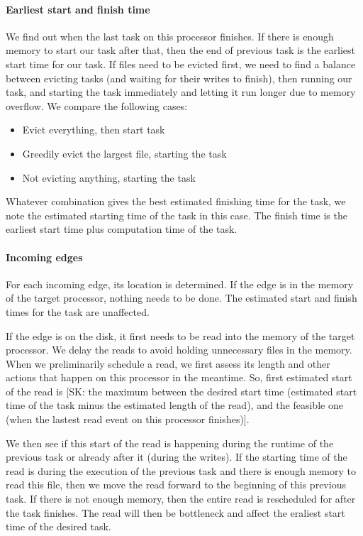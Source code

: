 \documentclass[conference]{IEEEtran}
\newcommand{\skug}[1]{{\color{blue}[SK: #1]}}
\begin{document}
    \paragraph{Earliest start and finish time}
    We find out when the last task on this processor finishes.
    If there is enough memory to start our task after that, then the end of previous task is the earliest start time for our task.
    If files need to be evicted first, we need to find a balance between evicting tasks (and waiting for their writes to finish),
    then running our task, and starting the task immediately and letting it run longer due to memory overflow.
    We compare the following cases:
    \begin{itemize}
        \item Evict everything, then start task
        \item Greedily evict the largest file, starting the task
        \item Not evicting anything, starting the task
    \end{itemize}
    Whatever combination gives the best estimated finishing time for the task, we note the estimated starting time of the task in this case.
     The finish time is the earliest start time  plus computation time of the task.


    \paragraph{Incoming edges} For each incoming edge, its location is determined.
    If the edge is in the memory of the target processor, nothing needs to be done.
    The estimated start and finish times for the task are unaffected.

    If the edge is on the disk, it first needs to be read into the memory of the target processor.
    We delay the reads to avoid holding unnecessary files in the memory.
    When we preliminarily schedule a read, we first assess its length and other actions that happen on this processor in the meantime.
    So, first estimated start of the read is \skug{the maximum between the desired start time (estimated start time of the task minus the estimated length of the read),
    and the feasible one (when the lastest read event on this processor finishes)}.

    We then see if this start of the read is happening during the runtime of the previous task or already after it (during the writes).
    If the starting time of the read is during the execution of the previous task and there is enough memory to read this file, then we move the read
    forward to the beginning of this previous task.
    If there is not enough memory, then the entire read is rescheduled for after the task finishes.
    The read will then be bottleneck and affect the eraliest start time of the desired task.
\end{document}
